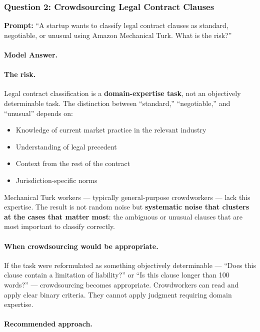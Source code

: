 \subsubsection{Question 2: Crowdsourcing Legal Contract Clauses}

\textbf{Prompt:} ``A startup wants to classify legal contract clauses as standard, negotiable, or unusual using Amazon Mechanical Turk. What is the risk?''

\paragraph{Model Answer.}

\paragraph{The risk.}
Legal contract classification is a \textbf{domain-expertise task}, not an objectively determinable task. The distinction between ``standard,'' ``negotiable,'' and ``unusual'' depends on:

\begin{itemize}
    \item Knowledge of current market practice in the relevant industry
    \item Understanding of legal precedent
    \item Context from the rest of the contract
    \item Jurisdiction-specific norms
\end{itemize}

Mechanical Turk workers --- typically general-purpose crowdworkers --- lack this expertise. The result is not random noise but \textbf{systematic noise that clusters at the cases that matter most}: the ambiguous or unusual clauses that are most important to classify correctly.

\paragraph{When crowdsourcing would be appropriate.}

If the task were reformulated as something objectively determinable --- ``Does this clause contain a limitation of liability?'' or ``Is this clause longer than 100 words?'' --- crowdsourcing becomes appropriate. Crowdworkers can read and apply clear binary criteria. They cannot apply judgment requiring domain expertise.

\paragraph{Recommended approach.}

